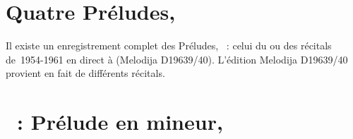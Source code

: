 \begin{workitemize}
 \item{}
 \begin{perfitemize}
  \item\NoEdition{}
 \end{perfitemize}
 \item{}
 \begin{perfitemize}
  \item{}
 \end{perfitemize}
\end{workitemize}

\section*{%
Quatre Préludes, }

Il existe un enregistrement complet des Préludes, ~: celui du ou
des récitals de~1954-1961 en direct à \MSHM (Melodija D19639/40).
L'édition Melodija D19639/40 provient en fait de différents récitals.

\section{\ifChrono \Scriabine{}~: \fi
Prélude en \kB \Flat mineur,  }
\label{\thesection}

